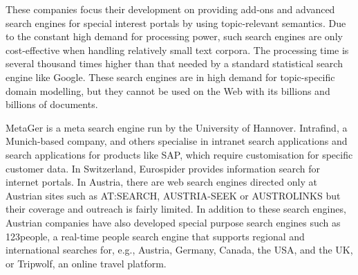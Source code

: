 \documentclass[]{../../metanetpaper}
\begin{document}
\begin{Parallel}[c]{79mm}{78mm}
{    These companies focus their development on providing add-ons and advanced search engines for special interest portals by using topic-relevant semantics. Due to the constant high demand for processing power, such search engines are only cost-effective when handling relatively small text corpora. The processing time is several thousand times higher than that needed by a standard statistical search engine like Google. These search engines are in high demand for topic-specific domain modelling, but they cannot be used on the Web with its billions and billions of documents.

    MetaGer is a meta search engine run by the University of Hannover. Intrafind, a Munich-based company, and others specialise in intranet search applications and search applications for products like SAP, which require customisation for specific customer data. In Switzerland, Eurospider provides information search for internet portals. In Austria, there are web search engines directed only at Austrian sites such as AT:SEARCH, AUSTRIA-SEEK or AUSTROLINKS but their coverage and outreach is fairly limited. In addition to these search engines, Austrian companies have also developed special purpose search engines such as 123people, a real-time people search engine that supports regional and international searches for, e.g., Austria, Germany, Canada, the USA, and the UK, or Tripwolf, an online travel platform.
  }
  
  \ParallelPar





\end{Parallel}
\end{document}
